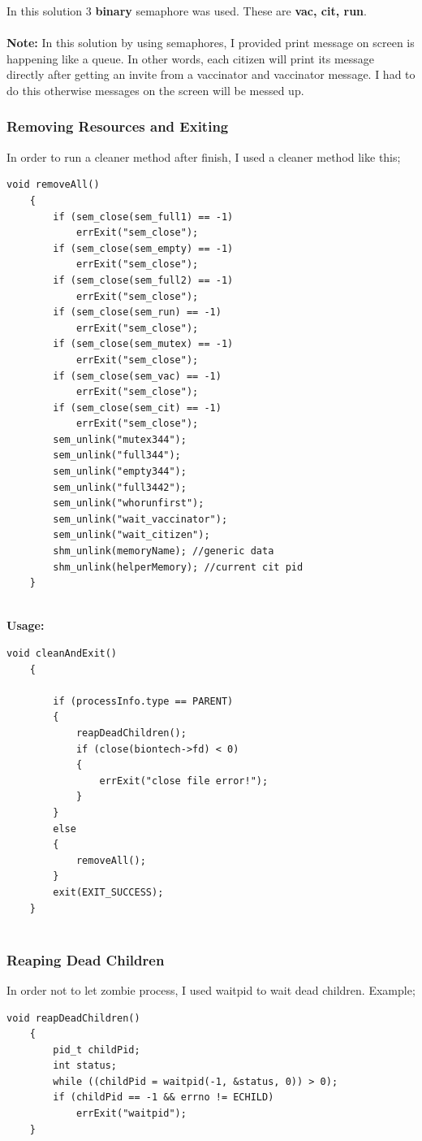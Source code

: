 \documentclass{article}
\begin{document}
In this solution 3 \textbf{binary} semaphore was used. These are \textbf{vac, cit, run}. \\ \\
\textbf{Note:} In this solution by using semaphores, I provided print message on screen
is happening like a queue. In other words, each citizen will print its message directly after getting an invite
from a vaccinator and vaccinator message. I had to do this otherwise messages on the screen will be messed up.
\subsubsection{Removing Resources and Exiting}
In order to run a cleaner method after finish, I used a cleaner method like this;
\begin{lstlisting}[style=CStyle]
    void removeAll()
    {
        if (sem_close(sem_full1) == -1)
            errExit("sem_close");
        if (sem_close(sem_empty) == -1)
            errExit("sem_close");
        if (sem_close(sem_full2) == -1)
            errExit("sem_close");
        if (sem_close(sem_run) == -1)
            errExit("sem_close");
        if (sem_close(sem_mutex) == -1)
            errExit("sem_close");
        if (sem_close(sem_vac) == -1)
            errExit("sem_close");
        if (sem_close(sem_cit) == -1)
            errExit("sem_close");
        sem_unlink("mutex344");
        sem_unlink("full344");
        sem_unlink("empty344");
        sem_unlink("full3442");
        sem_unlink("whorunfirst");
        sem_unlink("wait_vaccinator");
        sem_unlink("wait_citizen");
        shm_unlink(memoryName); //generic data
        shm_unlink(helperMemory); //current cit pid
    }
    
\end{lstlisting}
\cleardoublepage
\textbf{Usage: }
\begin{lstlisting}[style=CStyle]
    void cleanAndExit()
    {
        
        if (processInfo.type == PARENT)
        {
            reapDeadChildren();
            if (close(biontech->fd) < 0)
            {
                errExit("close file error!");
            }
        }
        else
        {
            removeAll();
        }
        exit(EXIT_SUCCESS);
    }
    
\end{lstlisting}
\subsubsection{Reaping Dead Children}
In order not to let zombie process, I used waitpid to wait dead children. Example;
\begin{lstlisting}[style=CStyle]
    void reapDeadChildren()
    {
        pid_t childPid;
        int status;
        while ((childPid = waitpid(-1, &status, 0)) > 0);
        if (childPid == -1 && errno != ECHILD)
            errExit("waitpid");
    }
\end{lstlisting}
\end{document}
